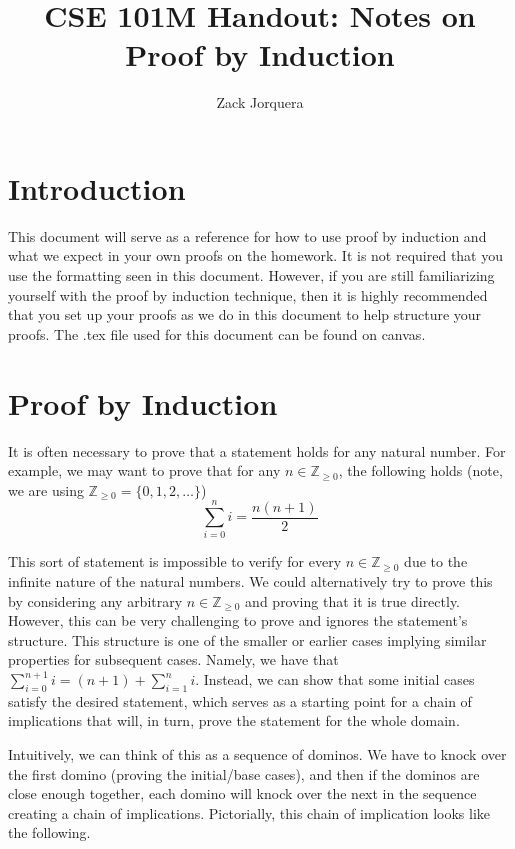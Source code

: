 \documentclass{article}
\title{CSE 101M Handout: Notes on Proof by Induction}
\author{Zack Jorquera}
\date{}
\newcommand{\ZZ}{\mathbb{Z}_{\geq 0}}
\theoremstyle{plain}
\theoremstyle{definition}
\begin{document}
\maketitle

\section{Introduction}

This document will serve as a reference for how to use proof by induction and what we expect in your own proofs on the homework. It is not required that you use the formatting seen in this document. However, if you are still familiarizing yourself with the proof by induction technique, then it is highly recommended that you set up your proofs as we do in this document to help structure your proofs. The .tex file used for this document can be found on canvas.

\section{Proof by Induction}

It is often necessary to prove that a statement holds for any natural number. For example, we may want to prove that for any \(n \in \ZZ\), the following holds (note, we are using \(\ZZ = \{0, 1, 2, \dotsc\}\))
\[\sum_{i=0}^n i = \frac{n(n+1)}{2}\]

This sort of statement is impossible to verify for every \(n \in \ZZ\) due to the infinite nature of the natural numbers. We could alternatively try to prove this by considering any arbitrary \(n \in \ZZ\) and proving that it is true directly. However, this can be very challenging to prove and ignores the statement's structure. This structure is one of the smaller or earlier cases implying similar properties for subsequent cases. Namely, we have that \(\sum_{i=0}^{n+1} i = (n+1) + \sum_{i=1}^n i\). Instead, we can show that some initial cases satisfy the desired statement, which serves as a starting point for a chain of implications that will, in turn, prove the statement for the whole domain.

Intuitively, we can think of this as a sequence of dominos. We have to knock over the first domino (proving the initial/base cases), and then if the dominos are close enough together, each domino will knock over the next in the sequence creating a chain of implications.
Pictorially, this chain of implication looks like the following.
\end{document}
